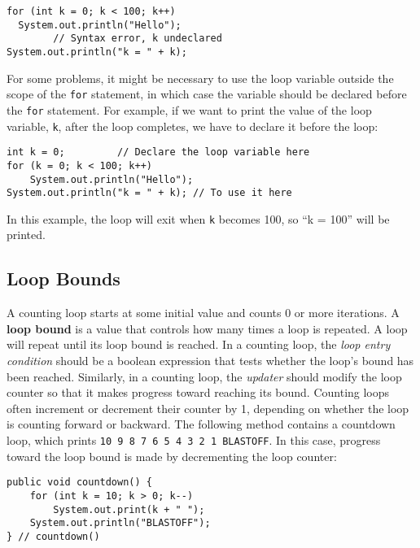 \begin{jjjlisting}
\begin{lstlisting}
for (int k = 0; k < 100; k++)
  System.out.println("Hello");
        // Syntax error, k undeclared
System.out.println("k = " + k);
\end{lstlisting}
\end{jjjlisting}

\noindent For some problems, it might be necessary to use the loop
variable outside the scope of the {\tt for} statement, in which case
the variable should be declared before the {\tt for} statement. For
example, if we want to print the value of the loop variable,
{\tt k}, after the loop completes, we have to declare it before
the loop:

\begin{jjjlisting}
\begin{lstlisting}
int k = 0;         // Declare the loop variable here
for (k = 0; k < 100; k++)
    System.out.println("Hello");
System.out.println("k = " + k); // To use it here
\end{lstlisting}
\end{jjjlisting}

\noindent In this example, the loop will exit when {\tt k} becomes
100, so ``k = 100'' will be printed.

\subsection{Loop Bounds}
\noindent A counting loop starts at some initial value and counts 0 or more
iterations.  A {\bf loop bound} is a value that controls how many times
a loop is repeated. A loop will repeat until its loop bound is reached.
In a counting loop, the {\it loop entry condition} should be a boolean
expression that tests whether the loop's bound has been reached.
Similarly, in a counting loop, the {\it updater} should modify the loop
counter so that it makes progress toward reaching its bound.  Counting
loops often increment or decrement their counter by 1, depending on
whether the loop is counting forward or backward.  The following
method contains a countdown loop, which prints {\tt 10 9 8 7 6 5 4 3
2 1 BLASTOFF}.  In this case, progress toward the loop bound is made by
decrementing the loop counter:


\begin{jjjlisting}
\begin{lstlisting}
public void countdown() {
    for (int k = 10; k > 0; k--)
        System.out.print(k + " ");
    System.out.println("BLASTOFF");
} // countdown()
\end{lstlisting}
\end{jjjlisting}

